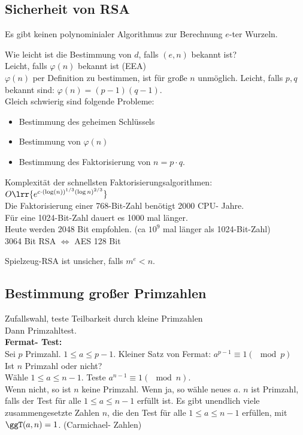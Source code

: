 	\subsection{Sicherheit von RSA}
			\item Es gibt keinen polynominialer Algorithmus zur Berechnung $e$-ter Wurzeln.
			\item Wie leicht ist die Bestimmung von $d$, falls $(e,n)$ bekannt ist?\\
				Leicht, falls $\varphi(n)$ bekannt ist (EEA)\\
				$\varphi(n)$ per Definition zu bestimmen, ist für große $n$ unmöglich. Leicht, falls $p,q$ bekannt sind: $\varphi(n)=(p-1)(q-1)$.\\
				Gleich schwierig sind folgende Probleme:
				\begin{itemize}
					\item Bestimmung des geheimen Schlüssels
					\item Bestimmung von $\varphi(n)$
					\item Bestimmung des Faktorisierung von $n=p\cdot q$.
				\end{itemize}
			\item Komplexität der schnellsten Faktorisierungsalgorithmen:
				$O\lrr{e^{c\cdot(\log(n))^{1/3}(\log n)^{2/3}}}$\\
				Die Faktorisierung einer 768-Bit-Zahl benötigt 2000 CPU- Jahre.\\
				Für eine 1024-Bit-Zahl dauert es 1000 mal länger.\\
				Heute werden 2048 Bit empfohlen. (ca $10^9$ mal länger als 1024-Bit-Zahl)\\
				3064 Bit RSA $\Leftrightarrow$ AES 128 Bit
			\item Spielzeug-RSA ist unsicher, falls $m^e<n$.
		\subExEnd

	\subsection{Bestimmung großer Primzahlen}
		Zufallswahl, teste Teilbarkeit durch kleine Primzahlen\\
		Dann Primzahltest.\\
		\textbf{Fermat- Test:}\\
		Sei $p$ Primzahl. $1\leq a\leq p-1$. Kleiner Satz von Fermat: $a^{p-1}\equiv 1(\mod p)$\\
		Ist $n$ Primzahl oder nicht?\\
		Wähle $1\leq a\leq n-1$. Teste $a^{n-1}\equiv 1(\mod n)$.\\
		Wenn nicht, so ist $n$ keine Primzahl. Wenn ja, so wähle neues $a$. $n$ ist Primzahl, falls der Test für alle $1\leq a\leq n-1$ erfüllt ist. Es gibt unendlich viele zusammengesetzte Zahlen $n$, die den Test für alle $1\leq a\leq n-1$ erfüllen, mit $\ggT(a,n)=1$. (Carmichael- Zahlen)

